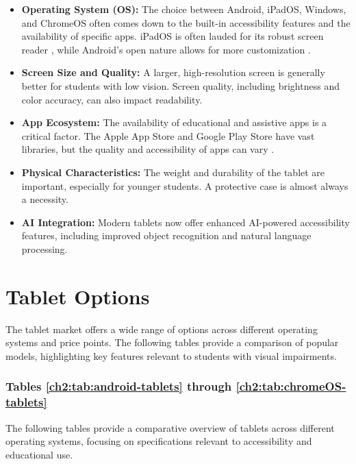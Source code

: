 \begin{itemize}
	\item \textbf{Operating System (OS):} The choice between Android, iPadOS, Windows, and ChromeOS often comes down to the built-in accessibility features and the availability of specific apps. iPadOS is often lauded for its robust  screen reader \supercite{AppleVoiceOver, AFBiOS}, while Android's open nature allows for more customization \supercite{AndroidAccessibility, GoogleTalkBack, SamsungAccessibility}.
	\item \textbf{Screen Size and Quality:} A larger, high-resolution screen is generally better for students with low vision. Screen quality, including brightness and color accuracy, can also impact readability.\supercite{AFBiOS, AAOTechnologyTools, BOIAScreenMagnifiers}
	\item \textbf{App Ecosystem:} The availability of educational and assistive apps is a critical factor. The Apple App Store and Google Play Store have vast libraries, but the quality and accessibility of apps can vary \supercite{AAOApps, Bookshare, VoiceDreamReader}.
	\item \textbf{Physical Characteristics:} The weight and durability of the tablet are important, especially for younger students. A protective case is almost always a necessity.\supercite{Day2021, Holbrook2006}
	\item \textbf{AI Integration:} Modern tablets now offer enhanced AI-powered accessibility features, including improved object recognition and natural language processing.\supercite{HIMSReleaseNotes, Android16Release, msseeingai, envision}
\end{itemize}

\section{Tablet Options}\label{ch2:sec:tablet-options}

The tablet market offers a wide range of options across different operating systems and price points. The following tables provide a comparison of popular models, highlighting key features relevant to students with visual impairments.

\subsubsection{Tables \ref{ch2:tab:android-tablets} through \ref{ch2:tab:chromeOS-tablets}}
The following tables provide a comparative overview of tablets across different operating systems, focusing on specifications relevant to \gls{accessibility} and educational use.


